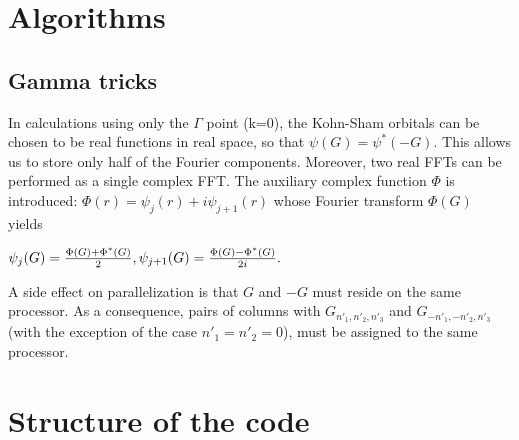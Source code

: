 \documentclass[12pt,a4paper]{article}
\begin{document}

\section{ Algorithms}
\subsection{Gamma tricks}

In calculations using only the $\Gamma$ point (k=0),
the Kohn-Sham orbitals can be chosen to be real functions in 
real space, so that 
$
  \psi(G) = \psi^*(-G).
$
This allows us to store only half of the Fourier components.
Moreover, two real FFTs can be performed as a single complex FFT.
The auxiliary complex function $\Phi$ is introduced:
$
    \Phi(r) = \psi_j(r)+ i \psi_{j+1}(r)
$
whose Fourier transform $\Phi(G)$ yields

$
   \psi_j    (G) =  {\Phi(G) + \Phi^*(G)\over 2},
   \psi_{j+1}(G) =  {\Phi(G) - \Phi^*(G)\over 2i}.
$

A side effect on parallelization is that $G$ and $-G$ must
reside on the same processor. As a consequence, pairs of columns
with $G_{n'_1,n'_2,n'_3}$ and $G_{-n'_1,-n'_2,n'_3}$
(with the exception of the case $n'_1=n'_2=0$),
must be assigned to the same processor.

\section{ Structure of the code}
\end{document}
